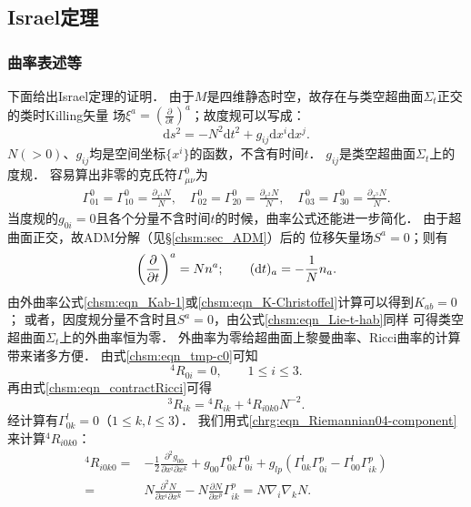\subsection{Israel定理}

\subsubsection{曲率表述等}
下面给出Israel定理的证明\cite{Israel-1967}． %
由于$M$是四维静态时空，故存在与类空超曲面$\Sigma_t$正交的类时Killing矢量
场$\xi^a=(\frac{\partial }{\partial t})^a$；故度规可以写成：
\begin{equation}
    \mathrm{d} s^2=  -N^2 \mathrm{d} t^2+g_{ij} \mathrm{d} x^i  \mathrm{d} x^j.
\end{equation}
$N(>0)$、$g_{ij}$均是空间坐标$\{x^i\}$的函数，不含有时间$t$．
$g_{ij}$是类空超曲面$\Sigma_t$上的度规．
容易算出非零的克氏符$\Gamma^{0}_{\mu\nu}$为
\begin{align}
    \Gamma^{0}_{01}=\Gamma^{0}_{10}= \frac{\partial_{x^1}N}{N},\quad
    \Gamma^{0}_{02}=\Gamma^{0}_{20}= \frac{\partial_{x^2}N}{N},\quad
    \Gamma^{0}_{03}=\Gamma^{0}_{30}= \frac{\partial_{x^3}N}{N}.
\end{align}
当度规的$g_{0i}=0$且各个分量不含时间$t$的时候，曲率公式还能进一步简化．
由于超曲面正交，故ADM分解（见\S\ref{chsm:sec_ADM}）后的
位移矢量场$S^a=0$；则有
\begin{equation}
    \left(\frac{\partial }{\partial t}\right)^a = N n^a ;\qquad
    ({\rm d}t)_a = -\frac{1}{N} n_a .
\end{equation}
由外曲率公式\eqref{chsm:eqn_Kab-1}或\eqref{chsm:eqn_K-Christoffel}计算可以得到$K_{ab}=0$；
或者，因度规分量不含时且$S^a=0$，由公式\eqref{chsm:eqn_Lie-t-hab}同样
可得类空超曲面$\Sigma_t$上的外曲率恒为零．
外曲率为零给超曲面上黎曼曲率、Ricci曲率的计算带来诸多方便．
由式\eqref{chsm:eqn_tmp-c0}可知
\begin{equation}\label{chsch:eqn_R4i0}
    {}^{4}{R}_{0i} =0 ,\qquad 1 \leqslant i \leqslant 3 .
\end{equation}
再由式\eqref{chsm:eqn_contractRicci}可得
\begin{equation*} %
    {}^{3}{R}_{ik}  ={}^{4} {R}_{ik} + {}^{4}{R}_{i0k0}  N^{-2} .
\end{equation*}
经计算有$\Gamma_{0k}^l=0$（$1 \leqslant k,l \leqslant 3$）．
我们用式\eqref{chrg:eqn_Riemannian04-component}来计算${}^{4}{R}_{i0k0}$：
\begin{align*}
    {}^{4}R_{i0k0} =& -\frac{1}{2}
    \frac{\partial^2 g_{00}} {\partial x^i\partial x^k}
    + g_{00}\Gamma_{0k}^0\Gamma_{0i}^0
    + g_{lp}\left( \Gamma_{0k}^l\Gamma_{0i}^p - \Gamma _{00}^l\Gamma_{ik}^p \right) \\
    =& N\frac{\partial^2 N} {\partial x^i\partial x^k}
    -  N \frac{\partial N}{\partial x^p}  \Gamma_{ik}^p 
    = N \nabla_i \nabla_k N .
\end{align*}
